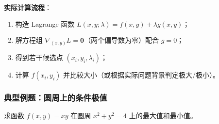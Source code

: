 \documentclass[lang=cn,11pt]{elegantbook}
\begin{document}
\noindent\textbf{实际计算流程}：
\begin{enumerate}
  \item 构造 Lagrange 函数 $L(x,y;\lambda)=f(x,y)+\lambda g(x,y)$；
  \item 解方程组 $\nabla_{(x,y)}L=\boldsymbol{0}$（两个偏导数为零）配合 $g=0$；
  \item 得到若干候选点 $(x_i,y_i,\lambda_i)$；
  \item 计算 $f(x_i,y_i)$ 并比较大小（或根据实际问题背景判定极大/极小）。
\end{enumerate}

\subsubsection*{典型例题：圆周上的条件极值}

\begin{example}[圆周上的乘积极值] \label{ex:circle-product-extreme}
求函数 $f(x,y)=xy$ 在圆周 $x^2+y^2=4$ 上的最大值和最小值。
\end{example}
\end{document}
